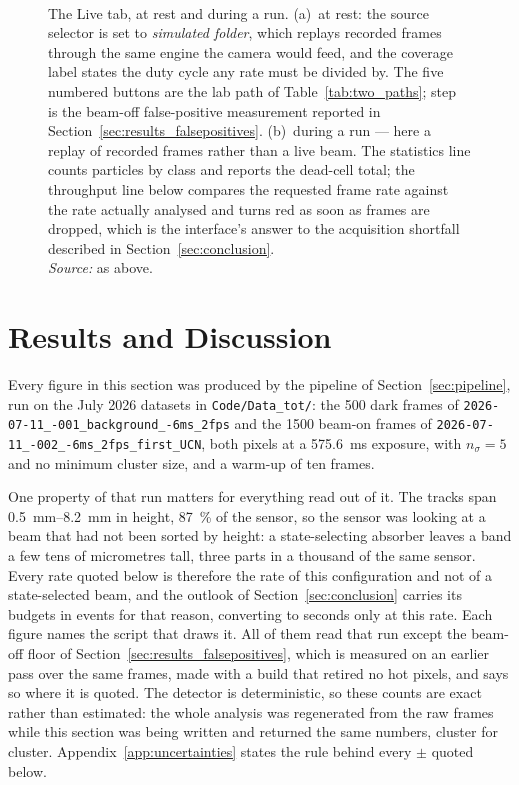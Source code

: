 \documentclass[a4paper,headsepline,oneside,11pt]{scrartcl}
\newcommand{\figsource}[1]{\\[3pt]{\footnotesize\emph{Source:} #1}}
\begin{document}
\begin{figure}[htbp]\centering
  \\[4pt]
  \caption{The \textsf{Live} tab, at rest and during a run.
  (a)~at rest: the source selector is set to \emph{simulated folder}, which
  replays recorded frames through the same engine the camera would feed, and the
  coverage label states the duty cycle any rate must be divided by. The five
  numbered buttons are the lab path of Table~\ref{tab:two_paths};
  step~ is the beam-off false-positive measurement reported in
  Section~\ref{sec:results_falsepositives}. (b)~during a run --- here a replay of
  recorded frames rather than a live beam. The statistics line counts particles
  by class and reports the dead-cell total; the throughput line below compares
  the requested frame rate against the rate actually analysed and turns red as
  soon as frames are dropped, which is the interface's answer to the acquisition
  shortfall described in Section~\ref{sec:conclusion}.\figsource{as
  above.}}
  \label{fig:gui_live_pair}
\end{figure}

\FloatBarrier
\newpage
\section{Results and Discussion}
\label{sec:results}

Every figure in this section was produced by the pipeline of
Section~\ref{sec:pipeline}, run on the July 2026 datasets in
\texttt{Code/Data\_tot/}: the 500 dark frames of
\texttt{2026-07-11\_-001\_\allowbreak background\_-6ms\_2fps} and the 1500 beam-on frames
of \texttt{2026-07-11\_-002\_-6ms\_\allowbreak 2fps\_first\_UCN}, both 
pixels at a \SI{575.6}{\milli\second} exposure, with $n_\sigma = 5$ and no
minimum cluster size, and a warm-up of ten frames.

One property of that run matters for everything read out of it. The tracks span
\SIrange{0.5}{8.2}{\milli\metre} in height, \SI{87}{\percent} of the sensor,
so the sensor was looking at a beam that had not been sorted by height: a
state-selecting absorber leaves a band a few tens of micrometres tall, three
parts in a thousand of the same sensor. Every rate quoted below is therefore the
rate of this configuration and not of a state-selected beam, and the outlook of
Section~\ref{sec:conclusion} carries its budgets in events for that reason,
converting to seconds only at this rate. Each figure names the script
that draws it. All of them read that run except the beam-off floor of
Section~\ref{sec:results_falsepositives}, which is measured on an earlier pass
over the same frames, made with a build that retired no hot pixels, and says so
where it is quoted. The detector is deterministic, so these counts are exact
rather than estimated: the whole analysis was regenerated from the raw frames
while this section was being written and returned the same numbers, cluster for
cluster. Appendix~\ref{app:uncertainties} states the rule behind every $\pm$ quoted
below.
\end{document}
